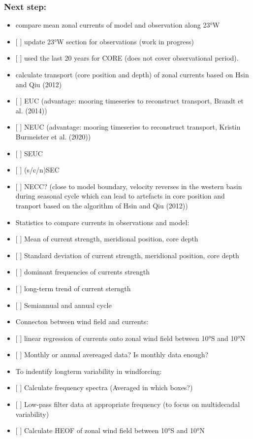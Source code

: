 \documentclass[a4paperpaper,]{article}
\providecommand{\tightlist}{%
  \setlength{\itemsep}{0pt}\setlength{\parskip}{0pt}}
\begin{document}
\subsubsection{Next step:}\label{next-step}

\begin{itemize}
\tightlist
\item
  compare mean zonal currents of model and observation along 23°W
\item
  {[} {]} update 23°W section for observations (work in progress)
\item
  {[} {]} used the last 20 years for CORE (does not cover observational
  period).
\item
  calculate transport (core position and depth) of zonal currents based
  on Hsin and Qiu (2012)
\item
  {[} {]} EUC (advantage: mooring timeseries to reconstruct transport,
  Brandt et al. (2014))
\item
  {[} {]} NEUC (advantage: mooring timeseries to reconstruct transport,
  Kristin Burmeister et al. (2020))
\item
  {[} {]} SEUC
\item
  {[} {]} (s/c/n)SEC
\item
  {[} {]} NECC? (close to model boundary, velocity reverses in the
  western basin during seasonal cycle which can lead to artefacts in
  core position and tranport based on the algorithm of Hsin and Qiu
  (2012))
\item
  Statistics to compare currents in observations and model:
\item
  {[} {]} Mean of current strength, meridional position, core depth
\item
  {[} {]} Standard deviation of current strength, meridional position,
  core depth
\item
  {[} {]} dominant frequencies of currents strength
\item
  {[} {]} long-term trend of current sterngth
\item
  {[} {]} Semiannual and annual cycle
\item
  Connecton between wind field and currents:
\item
  {[} {]} linear regression of currents onto zonal wind field between
  10°S and 10°N
\item
  {[} {]} Monthly or annual avereaged data? Is monthly data enough?
\item
  To indentify longterm variability in windforcing:
\item
  {[} {]} Calculate frequency spectra (Averaged in which boxes?)
\item
  {[} {]} Low-pass filter data at appropriate frequency (to focus on
  multidecadal variability)
\item
  {[} {]} Calculate HEOF of zonal wind field between 10°S and 10°N
\end{itemize}
\end{document}
